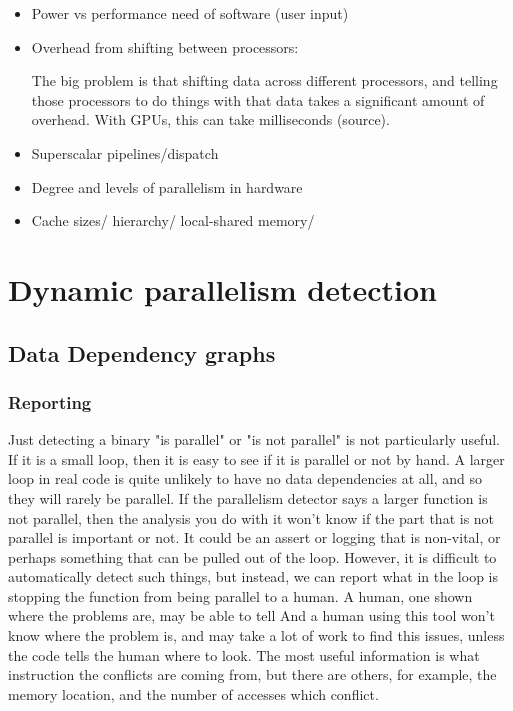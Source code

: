 \documentclass[12pt,twoside]{reedthesis}
\begin{document}
	\begin{itemize}
		\item Power vs performance need of software (user input)
		
		\item Overhead from shifting between processors:
		
		The big problem is that shifting data across different processors, and telling those processors to do things with that data takes a significant amount of overhead. With GPUs, this can take milliseconds (source). 
		
		\item Superscalar pipelines/dispatch
		
		\item Degree and levels of parallelism in hardware
		
		\item Cache sizes/ hierarchy/ local-shared memory/ 
		
	\end{itemize}

\chapter{Dynamic parallelism detection}
	\section{Data Dependency graphs}
		
		
		\subsection{Reporting}
		
		Just detecting a binary "is parallel" or "is not parallel" is not particularly useful. If it is a small loop, then it is easy to see if it is parallel or not by hand. A larger loop in real code is quite unlikely to have no data dependencies at all, and so they will rarely be parallel. If the parallelism detector says a larger function is not parallel, then the analysis you do with it won't know if the part that is not parallel is important or not. It could be an assert or logging that is non-vital, or perhaps something that can be pulled out of the loop. However, it is difficult to automatically detect such things, but instead, we can report what in the loop is stopping the function from being parallel to a human. A human, one shown where the problems are, may be able to tell  And a human using this tool won't know where the problem is, and may take a lot of work to find this issues, unless the code tells the human where to look. The most useful information is what instruction the conflicts are coming from, but there are others, for example, the memory location, and the number of accesses which conflict. 
		
\end{document}
